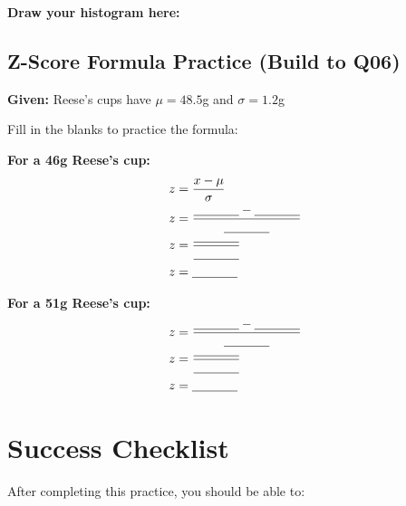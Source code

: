 \documentclass[11pt]{article}
\begin{document}
\textbf{Draw your histogram here:}

\vspace{2.5in}

\newpage

\subsection*{Z-Score Formula Practice (Build to Q06)}

\textbf{Given:} Reese's cups have $\mu = 48.5$g and $\sigma = 1.2$g

Fill in the blanks to practice the formula:

\textbf{For a 46g Reese's cup:}
\[
\begin{aligned}
z &= \frac{x - \mu}{\sigma} \\
z &= \frac{\underline{\hspace{0.5in}} - \underline{\hspace{0.5in}}}{\underline{\hspace{0.5in}}} \\
z &= \frac{\underline{\hspace{0.5in}}}{\underline{\hspace{0.5in}}} \\
z &= \underline{\hspace{0.5in}}
\end{aligned}
\]

\vspace{0.5in}

\textbf{For a 51g Reese's cup:}
\[
\begin{aligned}
z &= \frac{\underline{\hspace{0.5in}} - \underline{\hspace{0.5in}}}{\underline{\hspace{0.5in}}} \\
z &= \frac{\underline{\hspace{0.5in}}}{\underline{\hspace{0.5in}}} \\
z &= \underline{\hspace{0.5in}}
\end{aligned}
\]

\vspace{0.5in}

\section*{Success Checklist}

After completing this practice, you should be able to:
\end{document}
